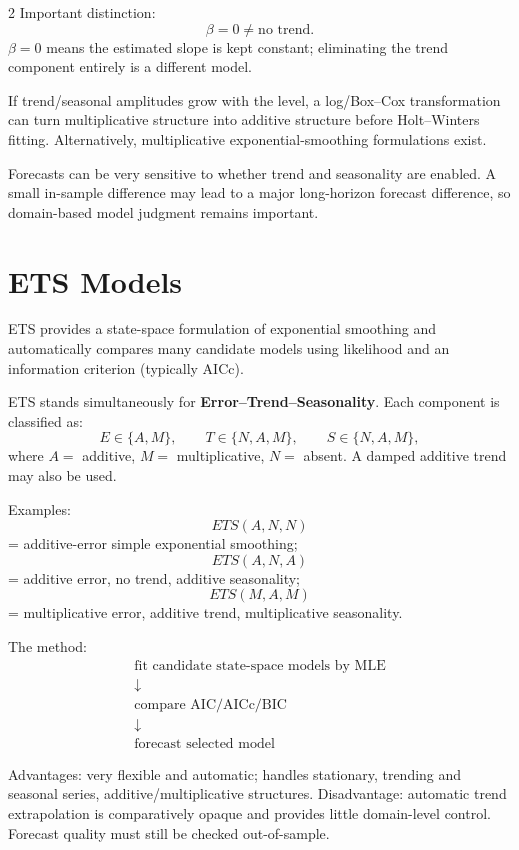 \documentclass[9pt,a4paper]{extarticle}
\newcommand{\key}[1]{\textbf{#1}}
\begin{document}
\begin{multicols}{2}
Important distinction:
\[
\boxed{\beta=0\neq\text{no trend}.}
\]
\(\beta=0\) means the estimated slope is kept constant; eliminating the trend component entirely is a different model.

If trend/seasonal amplitudes grow with the level, a log/Box--Cox transformation can turn multiplicative structure into additive structure before Holt--Winters fitting. Alternatively, multiplicative exponential-smoothing formulations exist.

Forecasts can be very sensitive to whether trend and seasonality are enabled. A small in-sample difference may lead to a major long-horizon forecast difference, so domain-based model judgment remains important.

\section{ETS Models}

ETS provides a state-space formulation of exponential smoothing and automatically compares many candidate models using likelihood and an information criterion (typically AICc).

ETS stands simultaneously for \key{Error--Trend--Seasonality}. Each component is classified as:
\[
E\in\{A,M\},\qquad
T\in\{N,A,M\},\qquad
S\in\{N,A,M\},
\]
where \(A=\) additive, \(M=\) multiplicative, \(N=\) absent. A damped additive trend may also be used.

Examples:
\[
ETS(A,N,N)
\]
= additive-error simple exponential smoothing;
\[
ETS(A,N,A)
\]
= additive error, no trend, additive seasonality;
\[
ETS(M,A,M)
\]
= multiplicative error, additive trend, multiplicative seasonality.

The method:
\[
\boxed{
\begin{array}{c}
\text{fit candidate state-space models by MLE}\\
\downarrow\\
\text{compare AIC/AICc/BIC}\\
\downarrow\\
\text{forecast selected model}
\end{array}
}
\]

Advantages: very flexible and automatic; handles stationary, trending and seasonal series, additive/multiplicative structures. Disadvantage: automatic trend extrapolation is comparatively opaque and provides little domain-level control. Forecast quality must still be checked out-of-sample.


\end{multicols}
\end{document}
